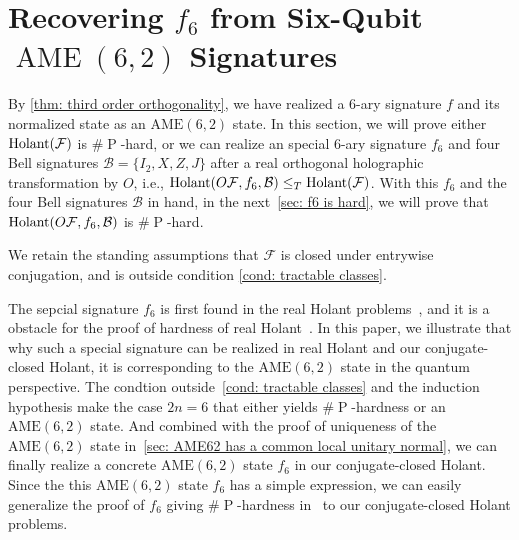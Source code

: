 \section{Recovering \texorpdfstring{$f_6$}{f6} from Six-Qubit $\operatorname{AME}(6,2)$ Signatures}
\label{sec:recover-f6}

By \cref{thm: third order orthogonality}, we have realized a 6-ary signature $f$ and its normalized state as an $\mathrm{AME}(6,2)$ state.
In this section, we will prove either $\operatorname{Holant}(\mathcal{F})$ is $\#\operatorname{P}$-hard, or we can realize an special 6-ary signature $f_6$ and four Bell signatures $\mathcal{B}=\{I_2,X,Z,J\}$ after a real orthogonal holographic transformation by $O$, i.e., $\operatorname{Holant}(O\mathcal{F},f_6,\mathcal{B})\leq_T \operatorname{Holant}(\mathcal{F})$. 
With this $f_6$ and the four Bell signatures $\mathcal{B}$ in hand, in the next~\cref{sec: f6 is hard}, we will prove that $\operatorname{Holant}(O\mathcal{F},f_6,\mathcal{B})$ is $\#\operatorname{P}$-hard. 

We retain the standing assumptions that $\mathcal F$ is closed under entrywise conjugation, and is
outside condition \eqref{cond: tractable classes}.

The sepcial signature $f_6$ is first found in the real Holant problems~\cite{realholant}, and it is a obstacle for the proof of hardness of real Holant~\cite{realholant}. In this paper, we illustrate that why such a special signature can be realized in real Holant and our conjugate-closed Holant, it is corresponding to the $\mathrm{AME}(6,2)$ state in the quantum perspective. The condtion outside~\eqref{cond: tractable classes} and the induction hypothesis make the case $2n=6$ that either yields $\#\operatorname{P}$-hardness or an $\mathrm{AME}(6,2)$ state. And combined with the proof of uniqueness of the $\mathrm{AME}(6,2)$ state in~\cref{sec: AME62 has a common local unitary normal}, we can finally realize a concrete $\mathrm{AME}(6,2)$ state $f_6$ in our conjugate-closed Holant. Since the this $\mathrm{AME}(6,2)$ state $f_6$ has a simple expression, we can easily generalize the proof of $f_6$ giving $\#\operatorname{P}$-hardness in~\cite{realholant} to our conjugate-closed Holant problems.

